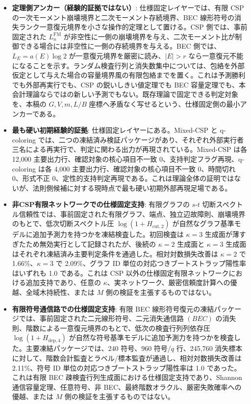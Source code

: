 \documentclass[12pt,a4paper]{article}
\begin{document}
\begin{itemize}
\tightlist
\item
  \textbf{定理側アンカー（経験的証拠ではない）}: 仕様固定レイヤーでは、有限 CSP の一次モーメント崩壊境界と二次モーメント存続境界、BEC 線形符号の消失ランク一意復元境界を小さな操作的定理として置ける。CSP 側では、事前固定された \(L_{n}^{\mathrm{FM}}\) が非空性に一側の崩壊境界を与え、二次モーメント比が制御できる場合には非空性に一側の存続境界を与える。BEC 側では、\(L_{E}=a(E)\log 2\) が一意復元境界を厳密に読み、\(|E|>r\) なら一意復元不能になることを示す。ランダム検査行列と消失数集中については、包絡を外部仮定として与えた場合の容量境界風の有限包絡までを置く。これは予測勝利でも外部再実行でも、CSP の鋭いしきい値定理でも BEC 容量定理でも、本会計理論ならではの新しい予測でもない。既存理論で固定できる判定対象を、本稿の \(G,V,m,L/B\) 座標へ矛盾なく写せるという、仕様固定側の最小アンカーである。
\item
  \textbf{最も硬い初期経験的証拠}: 仕様固定レイヤーにある。Mixed-CSP と q-coloring では、二つの凍結済み検証パッケージがあり、それぞれ外部実行者三名による再実行で、判定に関わる出力が再現されている。Mixed-CSP は各 12,000 主要出力行、確認対象の核心項目不一致 0、支持判定フラグ再現、q-coloring は各 4,000 主要出力行、確認対象の核心項目不一致 0、時間切れ 0、形式不正 0、定性的支持判定再現である。これは理論全体の証明ではないが、法則側候補に対する現時点で最も硬い初期外部再現足場である。
\item
  \textbf{非CSP有限ネットワークでの仕様固定支持}: 有限グラフの \(s\)-\(t\) 切断スペクトル信頼性では、事前固定された有限グラフ、端点、独立辺故障則、崩壊境界のもとで、低次切断スペクトル圧 \(\log(1+H_{\mathrm{cut},2})\) が自然なグラフ基準モデルに追加予測力を持つかを凍結検査した。初回検査は \(\kappa=3\) 生成面が薄すぎたため無効実行として記録されたが、後続の \(\kappa=2\) 生成面と \(\kappa=3\) 生成面はそれぞれ凍結済み主要判定条件を通過した。相対対数損失改善は \(\kappa=2\) で 1.66\%、\(\kappa=3\) で 2.09\%、グラフ ID 単位の対応つきブートストラップ陽性率はいずれも 1.0 である。これは CSP 以外の仕様固定有限ネットワークにおける追加支持であり、任意の \(\kappa\)、実ネットワーク、厳密信頼度計算への優越、全域木持続性、または \(M\) 側の検証を主張するものではない。
\item
  \textbf{有限符号通信路での仕様固定支持}: 有限 BEC 線形符号復元の凍結パッケージでは、事前固定された二元線形符号、二元消失通信路 \((BEC)\) の消失則、階数による一意復元境界のもとで、低次の検査行列列依存圧 \(\log(1+H_{\mathrm{dep},4})\) が自然な符号基準モデルに追加予測力を持つかを検査した。主要凍結パッケージでは、240 符号、960 符号/\(q\) 行、245,760 消失標本に対して、階数会計監査とラベル/標本監査が通過し、相対対数損失改善は 2.11\%、符号 ID 単位の対応つきブートストラップ陽性率は 1.0 であった。これは有限 BEC 疎検査行列生成面における仕様固定支持であり、Shannon 通信容量定理、任意符号、非 BEC、最終階数オラクル、厳密失敗確率への優越、または \(M\) 側の検証を主張するものではない。

\end{itemize}
\end{document}
